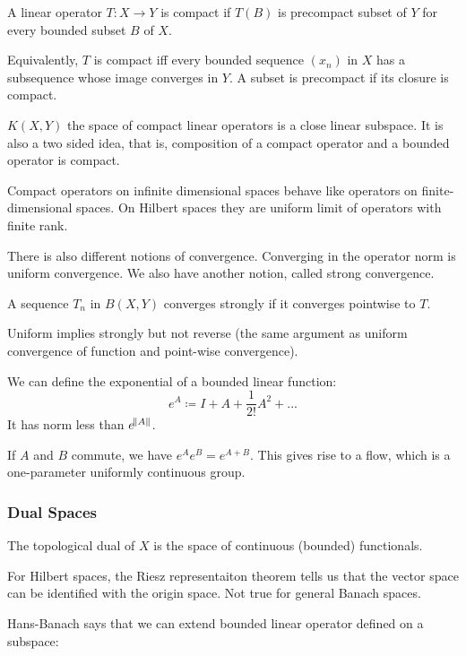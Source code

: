 \documentclass[main.tex]{subfiles}
\begin{document}
\begin{definition}
A linear operator $T: X \rightarrow Y$ is compact if $T(B)$ is precompact subset of $Y$ for every bounded subset $B$ of $X$.
\end{definition}

Equivalently, $T$ is compact iff every bounded sequence $(x_n)$ in $X$ has a subsequence whose image converges in $Y$. A subset is precompact if its closure is compact. 

\begin{proposition}
$K(X,Y)$ the space of compact linear operators is a close linear subspace. It is also a two sided idea, that is, composition of a compact operator and a bounded operator is compact.
\end{proposition}

Compact operators on infinite dimensional spaces behave like operators on finite-dimensional spaces. On Hilbert spaces they are uniform limit of operators with finite rank.

There is also different notions of convergence. Converging in the operator norm is uniform convergence. We also have another notion, called strong convergence.

\begin{definition}
A sequence $T_n$ in $B(X,Y)$ converges strongly if it converges pointwise to $T$.
\end{definition}
Uniform implies strongly but not reverse (the same argument as uniform convergence of function and point-wise convergence).

We can define the exponential of a bounded linear function:
$$
e^A \coloneqq I + A + \frac{1}{2!}A^2 + ...
$$
It has norm less than $e^{\norm{A}}$.

If $A$ and $B$ commute, we have $e^A e^B = e^{A + B}$. This gives rise to a flow, which is a one-parameter uniformly continuous group. 


\subsubsection{Dual Spaces}
The topological dual of $X$ is the space of continuous (bounded) functionals.

For Hilbert spaces, the Riesz representaiton theorem tells us that the vector space can be identified with the origin space. Not true for general Banach spaces.

Hans-Banach says that we can extend bounded linear operator defined on a subspace:
\end{document}
